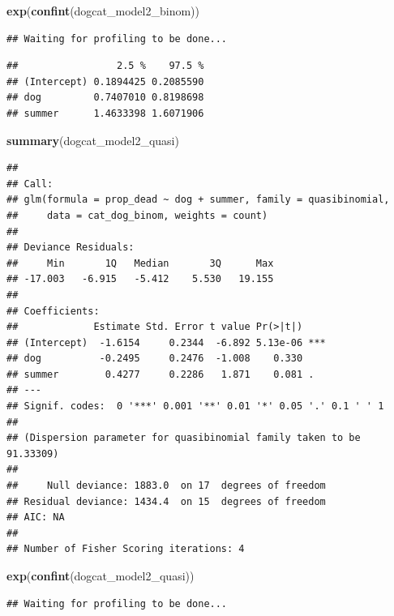 \documentclass[]{article}
\newenvironment{Shaded}{\begin{snugshade}}{\end{snugshade}}
\newcommand{\KeywordTok}[1]{\textcolor[rgb]{0.13,0.29,0.53}{\textbf{#1}}}
\newcommand{\NormalTok}[1]{#1}
\begin{document}
\begin{Shaded}
\begin{Highlighting}[]
\KeywordTok{exp}\NormalTok{(}\KeywordTok{confint}\NormalTok{(dogcat_model2_binom))}
\end{Highlighting}
\end{Shaded}

\begin{verbatim}
## Waiting for profiling to be done...
\end{verbatim}

\begin{verbatim}
##                 2.5 %    97.5 %
## (Intercept) 0.1894425 0.2085590
## dog         0.7407010 0.8198698
## summer      1.4633398 1.6071906
\end{verbatim}

\begin{Shaded}
\begin{Highlighting}[]
\KeywordTok{summary}\NormalTok{(dogcat_model2_quasi)}
\end{Highlighting}
\end{Shaded}

\begin{verbatim}
## 
## Call:
## glm(formula = prop_dead ~ dog + summer, family = quasibinomial, 
##     data = cat_dog_binom, weights = count)
## 
## Deviance Residuals: 
##     Min       1Q   Median       3Q      Max  
## -17.003   -6.915   -5.412    5.530   19.155  
## 
## Coefficients:
##             Estimate Std. Error t value Pr(>|t|)    
## (Intercept)  -1.6154     0.2344  -6.892 5.13e-06 ***
## dog          -0.2495     0.2476  -1.008    0.330    
## summer        0.4277     0.2286   1.871    0.081 .  
## ---
## Signif. codes:  0 '***' 0.001 '**' 0.01 '*' 0.05 '.' 0.1 ' ' 1
## 
## (Dispersion parameter for quasibinomial family taken to be 91.33309)
## 
##     Null deviance: 1883.0  on 17  degrees of freedom
## Residual deviance: 1434.4  on 15  degrees of freedom
## AIC: NA
## 
## Number of Fisher Scoring iterations: 4
\end{verbatim}

\begin{Shaded}
\begin{Highlighting}[]
\KeywordTok{exp}\NormalTok{(}\KeywordTok{confint}\NormalTok{(dogcat_model2_quasi))}
\end{Highlighting}
\end{Shaded}

\begin{verbatim}
## Waiting for profiling to be done...
\end{verbatim}
\end{document}
